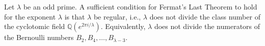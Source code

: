 Let $\lambda$ be an odd prime. A sufficient condition for Fermat's Last Theorem to hold for the exponent $\lambda$ is that $\lambda$ be regular, i.e., $\lambda$ does not divide the class number of the cyclotomic field $\mathbb{Q}(e^{2\pi i/\lambda})$. Equivalently, $\lambda$ does not divide the numerators of the Bernoulli numbers $B_2, B_4, \ldots, B_{\lambda-3}$.
